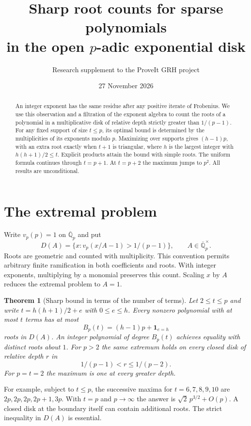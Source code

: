 \documentclass[11pt]{article}
\title{Sharp root counts for sparse polynomials\\in the open $p$-adic exponential disk}
\author{Research supplement to the ProveIt GRH project}
\date{27 November 2026}
\newtheorem{theorem}{Theorem}
\newcommand{\Q}{\mathbb Q}
\newcommand{\ord}{v_p}
\begin{document}
\maketitle
\begin{abstract}
An integer exponent has the same residue after any positive iterate of Frobenius. We use this observation and a filtration of the exponent algebra to count the roots of a polynomial in a multiplicative disk of relative depth strictly greater than $1/(p-1)$. For any fixed support of size $t\le p$, its optimal bound is determined by the multiplicities of its exponents modulo $p$. Maximizing over supports gives $(h-1)p$, with an extra root exactly when $t+1$ is triangular, where $h$ is the largest integer with $h(h+1)/2\le t$. Explicit products attain the bound with simple roots. The uniform formula continues through $t=p+1$. At $t=p+2$ the maximum jumps to $p^2$. All results are unconditional.
\end{abstract}

\section{The extremal problem}
Write $\ord(p)=1$ on $\overline{\Q}_p$ and put
\[
 D(A)=\{x:\ord(x/A-1)>1/(p-1)\},\qquad A\in\overline{\Q}_p^\times.
\]
Roots are geometric and counted with multiplicity. This convention permits arbitrary finite ramification in both coefficients and roots. With integer exponents, multiplying by a monomial preserves this count. Scaling $x$ by $A$ reduces the extremal problem to $A=1$.

\begin{theorem}[Sharp bound in terms of the number of terms]\label{thm:all}
Let $2\le t\le p$ and write $t=h(h+1)/2+e$ with $0\le e\le h$. Every nonzero polynomial with at most $t$ terms has at most
\[
 B_p(t)=(h-1)p+\mathbf 1_{e=h}
\]
roots in $D(A)$. An integer polynomial of degree $B_p(t)$ achieves equality with distinct roots about $1$. For $p>2$ the same extremum holds on every closed disk of relative depth $r$ in
\[
 1/(p-1)<r\le 1/(p-2).
\]
For $p=t=2$ the maximum is one at every greater depth.
\end{theorem}

For example, subject to $t\le p$, the successive maxima for $t=6,7,8,9,10$ are $2p,2p,2p,2p+1,3p$. With $t=p$ and $p\to\infty$ the answer is $\sqrt{2}\,p^{3/2}+O(p)$. A closed disk at the boundary itself can contain additional roots. The strict inequality in $D(A)$ is essential.
\end{document}
